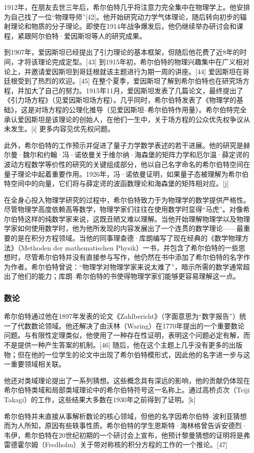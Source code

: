 1912年，在朋友去世三年后，希尔伯特几乎将注意力完全集中在物理学上。他安排为自己找了一位“物理导师”[42]。他开始研究动力学气体理论，随后转向初步的辐射理论和物质的分子理论。即使在1914年战争爆发后，他仍继续举办研讨会和课程，紧跟阿尔伯特·爱因斯坦等人的研究成果。

到1907年，爱因斯坦已经提出了引力理论的基本框架，但随后他花费了近8年的时间，才将该理论完成定型。[43] 到1915年初，希尔伯特的物理兴趣集中在广义相对论上，并邀请爱因斯坦到哥廷根就该主题进行为期一周的讲座。[44] 爱因斯坦在哥廷根受到了热烈的欢迎。[45] 在整个夏季，爱因斯坦了解到希尔伯特也在研究场方程，并加大了自己的努力。1915年11月，爱因斯坦发表了几篇论文，最终提出了《引力场方程》（见爱因斯坦场方程）。几乎同时，希尔伯特发表了《物理学的基础》，这是对场方程的公理化推导（见爱因斯坦–希尔伯特作用量）。希尔伯特完全承认爱因斯坦是该理论的创始人，在他们一生中，关于场方程的公众优先权争议从未发生。[i] 更多内容见优先权问题。

此外，希尔伯特的工作预示并促进了量子力学数学表述的若干进展。他的研究是赫尔曼·魏尔和约翰·冯·诺依曼关于维尔纳·海森堡的矩阵力学和厄尔温·薛定谔的波动方程数学等价性的研究的关键组成部分，他以自己名字命名的希尔伯特空间在量子理论中起着重要作用。1926年，冯·诺依曼证明，如果量子态被理解为希尔伯特空间中的向量，它们将与薛定谔的波函数理论和海森堡的矩阵相对应。[j]

在全身心投入物理学研究的过程中，希尔伯特致力于为物理学的数学提供严格性。尽管物理学高度依赖高等数学，物理学家们往往在使用数学时显得“马虎”。对像希尔伯特这样的纯数学家来说，这既丑陋又难以理解。当他开始理解物理学以及物理学家如何使用数学时，他为他所发现的内容发展出了一个连贯的数学理论——最重要的是在积分方程领域。当他的同事理查德·库朗编写了现在经典的《数学物理方法》（Methoden der mathematischen Physik）一书，并包含了希尔伯特的一些思想时，尽管希尔伯特并没有直接参与写作，他仍然在书中添加了希尔伯特的名字作为作者。希尔伯特曾说：“物理学对物理学家来说太难了”，暗示所需的数学通常超出了他们的能力；库朗–希尔伯特的书使得物理学家们能够更容易理解这一点。
\subsubsection{数论}
希尔伯特通过他在1897年发表的论文《Zahlbericht》（字面意思为“数字报告”）统一了代数数论领域。他还解决了由沃林（Waring）在1770年提出的一个重要数论问题。与有限性定理类似，他使用了一种存在性证明，表明这个问题必定有解，而不是提供一种产生答案的机制。[46] 随后，他在这个主题上几乎没有更多的出版物；但在他的一位学生的论文中出现了希尔伯特模形式，因此他的名字进一步与这一重要领域相关联。

他还对类域理论提出了一系列猜想。这些概念具有深远的影响，他的贡献仍体现在希尔伯特类域和局部类域理论中的希尔伯特符号这一名称上。通过高桥贞次（Teiji Takagi）的工作，这些结果大多数在1930年之前得到了证明。[k]

希尔伯特并未直接从事解析数论的核心领域，但他的名字因希尔伯特–波利亚猜想而为人所知，原因有些轶事性质。希尔伯特的学生恩斯特·海林格曾告诉安德烈·韦伊，希尔伯特在20世纪初期的一个研讨会上宣布，他预计黎曼猜想的证明将是弗雷德霍尔姆（Fredholm）关于带对称核的积分方程的工作的一个推论。[47]